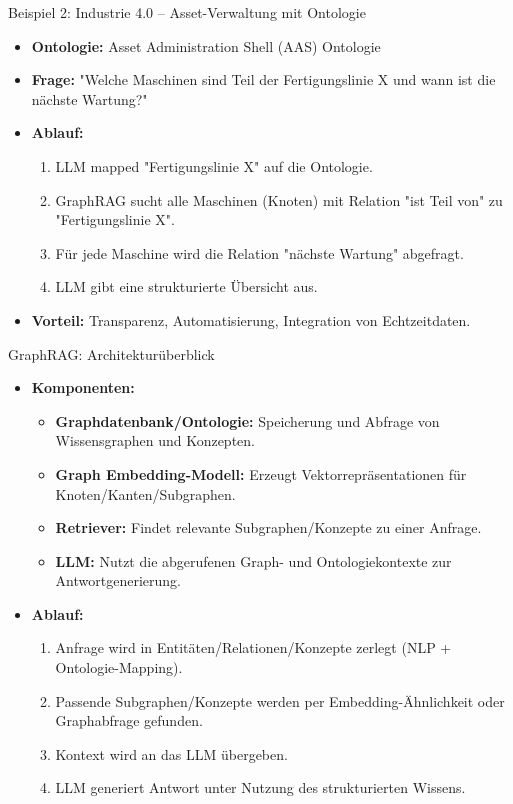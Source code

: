 \documentclass[aspectratio=1610, xcolor=dvipsnames, 9pt]{beamer}
\begin{document}
\begin{frame}{Beispiel 2: Industrie 4.0 – Asset-Verwaltung mit Ontologie}
  \begin{itemize}
    \item \textbf{Ontologie:} Asset Administration Shell (AAS) Ontologie
    \item \textbf{Frage:} "Welche Maschinen sind Teil der Fertigungslinie X und wann ist die nächste Wartung?"
    \item \textbf{Ablauf:}
      \begin{enumerate}
        \item LLM mapped "Fertigungslinie X" auf die Ontologie.
        \item GraphRAG sucht alle Maschinen (Knoten) mit Relation "ist Teil von" zu "Fertigungslinie X".
        \item Für jede Maschine wird die Relation "nächste Wartung" abgefragt.
        \item LLM gibt eine strukturierte Übersicht aus.
      \end{enumerate}
    \item \textbf{Vorteil:} Transparenz, Automatisierung, Integration von Echtzeitdaten.
  \end{itemize}
\end{frame}

\begin{frame}{GraphRAG: Architekturüberblick}
  \begin{itemize}
    \item \textbf{Komponenten:}
      \begin{itemize}
        \item \textbf{Graphdatenbank/Ontologie:} Speicherung und Abfrage von Wissensgraphen und Konzepten.
        \item \textbf{Graph Embedding-Modell:} Erzeugt Vektorrepräsentationen für Knoten/Kanten/Subgraphen.
        \item \textbf{Retriever:} Findet relevante Subgraphen/Konzepte zu einer Anfrage.
        \item \textbf{LLM:} Nutzt die abgerufenen Graph- und Ontologiekontexte zur Antwortgenerierung.
      \end{itemize}
    \item \textbf{Ablauf:}
      \begin{enumerate}
        \item Anfrage wird in Entitäten/Relationen/Konzepte zerlegt (NLP + Ontologie-Mapping).
        \item Passende Subgraphen/Konzepte werden per Embedding-Ähnlichkeit oder Graphabfrage gefunden.
        \item Kontext wird an das LLM übergeben.
        \item LLM generiert Antwort unter Nutzung des strukturierten Wissens.
      \end{enumerate}
  \end{itemize}
\end{frame}
\end{document}
